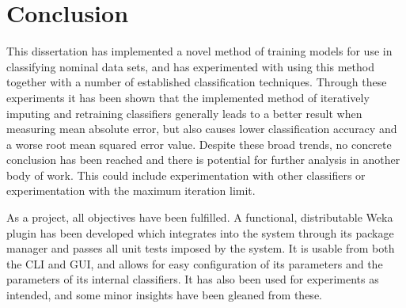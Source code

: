 \newpage
\chapter{Conclusion}\label{conclusion}
This dissertation has implemented a novel method of training models for use in classifying nominal data sets, and has experimented with using this method together with a number of established classification techniques. Through these experiments it has been shown that the implemented method of iteratively imputing and retraining classifiers generally leads to a better result when measuring mean absolute error, but also causes lower classification accuracy and a worse root mean squared error value. Despite these broad trends, no concrete conclusion has been reached and there is potential for further analysis in another body of work. This could include experimentation with other classifiers or experimentation with the maximum iteration limit.

As a project, all objectives have been fulfilled. A functional, distributable Weka plugin has been developed which integrates into the system through its package manager and passes all unit tests imposed by the system. It is usable from both the CLI and GUI, and allows for easy configuration of its parameters and the parameters of its internal classifiers. It has also been used for experiments as intended, and some minor insights have been gleaned from these.